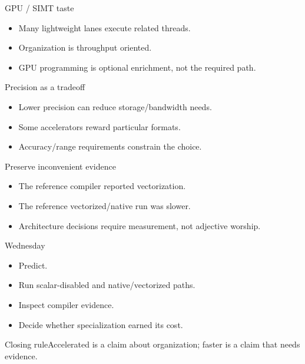 \documentclass{beamer}
\begin{document}
\begin{frame}{GPU / SIMT taste}\begin{itemize}\item Many lightweight lanes execute related threads.\item Organization is throughput oriented.\item GPU programming is optional enrichment, not the required path.\end{itemize}\end{frame}
\begin{frame}{Precision as a tradeoff}\begin{itemize}\item Lower precision can reduce storage/bandwidth needs.\item Some accelerators reward particular formats.\item Accuracy/range requirements constrain the choice.\end{itemize}\end{frame}
\begin{frame}{Preserve inconvenient evidence}\begin{itemize}\item The reference compiler reported vectorization.\item The reference vectorized/native run was slower.\item Architecture decisions require measurement, not adjective worship.\end{itemize}\end{frame}
\begin{frame}{Wednesday}\begin{itemize}\item Predict.\item Run scalar-disabled and native/vectorized paths.\item Inspect compiler evidence.\item Decide whether specialization earned its cost.\end{itemize}\end{frame}
\begin{frame}{Closing rule}\centering\Large Accelerated is a claim about organization; faster is a claim that needs evidence.\end{frame}
\end{document}

